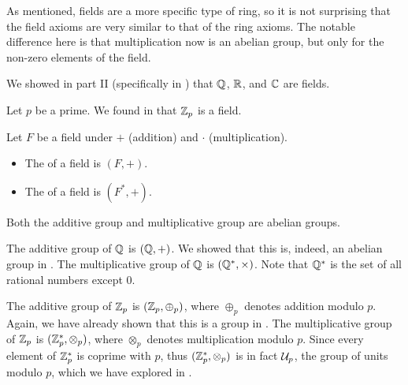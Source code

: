 As mentioned, fields are a more specific type of ring, so it is not surprising that the field axioms are very similar to that of the ring axioms. The notable difference here is that multiplication now is an abelian group, but only for the non-zero elements of the field.

\begin{example}
    We showed in part II (specifically in ) that $\mathbb{Q}$, $\mathbb{R}$, and $\mathbb{C}$ are fields.
\end{example}

\begin{example}
    Let $p$ be a prime. We found in  that $\mathbb{Z}_p$ is a field.
\end{example}

\begin{definition}
    Let $F$ be a field under $+$ (addition) and $\cdot$ (multiplication).
    \begin{itemize}
        \item The  of a field is $(F, +)$.
        \item The  of a field is $(F^\ast, +)$.
    \end{itemize}
    Both the additive group and multiplicative group are abelian groups.
\end{definition}

\begin{example}
    The additive group of $\mathbb{Q}$ is $(\mathbb{Q}, +)$. We showed that this is, indeed, an abelian group in . The multiplicative group of $\mathbb{Q}$ is $(\mathbb{Q}^\ast, \times)$. Note that $\mathbb{Q}^\ast$ is the set of all rational numbers except 0.
\end{example}

\begin{example}
    The additive group of $\mathbb{Z}_p$ is $(\mathbb{Z}_p, \oplus_p)$, where $\oplus_p$ denotes addition modulo $p$. Again, we have already shown that this is a group in . The multiplicative group of $\mathbb{Z}_p$ is $(\mathbb{Z}_p^\ast, \otimes_p)$, where $\otimes_p$ denotes multiplication modulo $p$. Since every element of $\mathbb{Z}_p^\ast$ is coprime with $p$, thus $(\mathbb{Z}_p^\ast, \otimes_p)$ is in fact $\mathcal{U}_{p}$, the group of units modulo $p$, which we have explored in .
\end{example}

